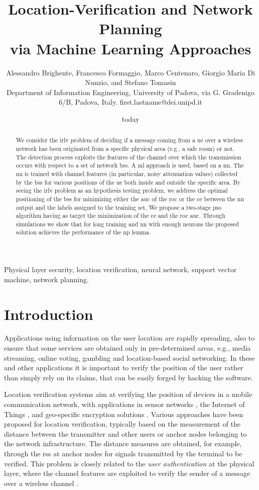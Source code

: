 \documentclass[conference]{IEEEtran}
\title{Location-Verification and Network Planning \\ via Machine Learning Approaches}
\author{Alessandro Brighente, Francesco Formaggio, Marco Centenaro, Giorgio Maria Di Nunzio, and    Stefano Tomasin \\ {\small Department of Information Engineering, University of Padova, via G. Gradenigo 6/B, Padova, Italy. first.lastname@dei.unipd.it} }
\date{today}
\begin{document}
\maketitle

\begin{abstract}
We consider the \ac{irlv} problem of deciding if a message coming from a \ac{ue} over a wireless network has been originated from a specific physical area (e.g., a safe room) or not. The detection process exploits the features of the channel over which the transmission occurs with respect to a set of network \acp{bs}. A  \ac{ml} approach is used, based on a \ac{nn}. The \ac{nn} is trained with channel features (in particular, noisy attenuation values) collected by the \acp{bs} for various positions of the \ac{ue} both inside and outside the specific area. By seeing the \ac{irlv} problem as an hypothesis testing problem, we address the optimal positioning of the \acp{bs} for minimizing either the \ac{auc} of the \ac{roc} or  the \ac{ce} between the \ac{nn} output and the labels assigned to the training set. We propose a two-stage \ac{pso} algorithm having as target the  minimization of  the \ac{ce} and  the \ac{roc} \ac{auc}. Through simulations we show that for long training and \ac{nn} with enough neurons the proposed solution achieves the performance of the \ac{np} lemma.
\end{abstract}

\begin{IEEEkeywords}
Physical layer security, location verification, neural network, support vector machine, network planning.
\end{IEEEkeywords}
\glsresetall

\section{Introduction}

Applications using information on the user location are rapidly spreading, also to ensure that some services are obtained only in pre-determined areas, e.g., media streaming, online voting, gambling and location-based social networking. In these and other applications it is important to verify the position of the user rather than simply rely on its claims, that can be easily forged by hacking the software.

Location verification systems aim at verifying the position of devices in a mobile communication network, with applications in sensor networks \cite{Zeng-survey, 8376254}, the Internet of Things \cite{7903611}, and geo-specific encryption solutions \cite{quaglia}. Various approaches have been proposed for location verification, typically based on the measurement of the distance between the transmitter and other users  or  anchor nodes belonging to the network infrastructure. The distance measures are obtained, for example, through the \ac{rss} at anchor nodes for signals transmitted by the terminal to be verified.  This problem is closely related to the {\em user authentication} at the physical layer, where the channel features are exploited to verify the sender of a message over a wireless channel \cite{7270404}.
\end{document}
